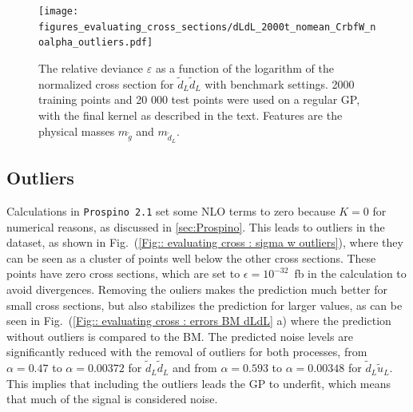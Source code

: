 \documentclass[twoside,english]{uiofysmaster}
\begin{document}
\begin{figure}
\centering
\texttt{[image: figures\_evaluating\_cross\_sections/dLdL\_2000t\_nomean\_CrbfW\_noalpha\_outliers.pdf]}
\caption{The relative deviance $\varepsilon$ as a function of the logarithm of the normalized cross section for $\tilde{d}_L \tilde{d}_L$ with benchmark settings. 2000 training points and 20 000 test points were used on a regular GP, with the final kernel as described in the text. Features are the physical masses $m_{\tilde{g}}$ and $m_{\tilde{d}_L}$.}
\label{Fig:: evaluating cross : BM dLdL error plot}
\end{figure}


\subsection{Outliers}

Calculations in \verb|Prospino 2.1| set some NLO terms to zero because $K=0$ for numerical reasons, as discussed in \ref{sec:Prospino}. This leads to outliers in the dataset, as shown in Fig.\ (\ref{Fig:: evaluating cross : sigma w outliers}), where they can be seen as a cluster of points well below the other cross sections. These points have zero cross sections, which are set to $\epsilon = 10^{-32}$~fb in the calculation to avoid divergences. Removing the ouliers makes the prediction much better for small cross sections, but also stabilizes the prediction for larger values, as can be seen in Fig.\ (\ref{Fig:: evaluating cross : errors BM dLdL} a) where the prediction without outliers is compared to the BM. The predicted noise levels are significantly reduced with the removal of outliers for both processes, from $\alpha = 0.47$ to $\alpha = 0.00372$ for $\tilde{d}_L \tilde{d}_L$ and from $\alpha = 0.593$ to $\alpha= 0.00348$ for $\tilde{d}_L \tilde{u}_L$. This implies that including the outliers leads the GP to underfit, which means that much of the signal is considered noise.   
\end{document}
